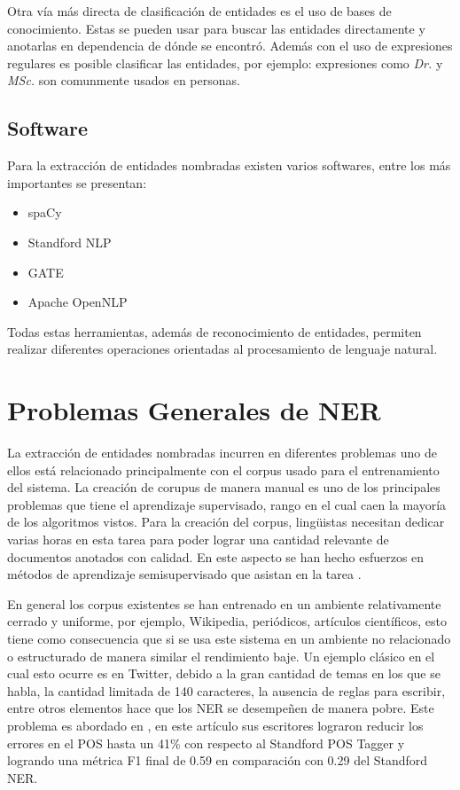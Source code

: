 \documentclass[runningheads]{llncs}
\begin{document}
Otra vía más directa de clasificación de entidades es el uso de bases de conocimiento. Estas se pueden usar para buscar las entidades directamente y anotarlas en dependencia de dónde se encontró. Además con el uso de expresiones regulares es posible clasificar las entidades, por ejemplo: expresiones como \emph{Dr.} y \emph{MSc.} son comunmente usados en personas.

\subsection{Software}

Para la extracción de entidades nombradas existen varios softwares, entre los más importantes se presentan:

\begin{itemize}

\item spaCy \cite{spacy_nlp}
\item Standford NLP \cite{standford_nlp}
\item GATE \cite{gate_nlp}
\item Apache OpenNLP \cite{open_nlp}

\end{itemize}

Todas estas herramientas, además de reconocimiento de entidades, permiten realizar diferentes operaciones orientadas al procesamiento de lenguaje natural.

\section{Problemas Generales de NER}

La extracción de entidades nombradas incurren en diferentes problemas uno de ellos está relacionado principalmente con el corpus usado para el entrenamiento del sistema. La creación de corupus de manera manual es uno de los principales problemas que tiene el aprendizaje supervisado, rango en el cual caen la mayoría de los algoritmos vistos. Para la creación del corpus, lingüistas necesitan dedicar varias horas en esta tarea para poder lograr una cantidad relevante de documentos anotados con calidad. En este aspecto se han hecho esfuerzos en métodos de aprendizaje semisupervisado que asistan en la tarea \cite{SSFNER}. %

En general los corpus existentes se han entrenado en un ambiente relativamente cerrado y uniforme, por ejemplo, Wikipedia, periódicos, artículos científicos, esto tiene como consecuencia que si se usa este sistema en un ambiente no relacionado o estructurado de manera similar el rendimiento baje. Un ejemplo clásico en el cual esto ocurre es en Twitter, debido a la gran cantidad de temas en los que se habla, la cantidad limitada de 140 caracteres, la ausencia de reglas para escribir,  entre otros elementos hace que los NER se desempeñen de manera pobre. Este problema es abordado en \cite{tweeter}, en este artículo sus escritores lograron reducir los errores en el POS hasta un 41\% con respecto al Standford POS Tagger y logrando una métrica F1 final de 0.59 en comparación con 0.29 del Standford NER. 
\end{document}
